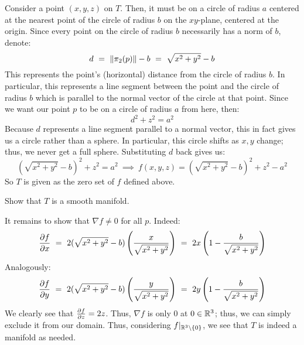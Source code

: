 \vspace{-0.3in}
\begin{soln}
    Consider a point $ (x,y,z) $ on $ T $. Then, it must be on a circle of
    radius $ a $ centered at the nearest point of the circle of radius $ b $ on
    the $ xy $-plane, centered at the origin. Since every point on the circle of
    radius $ b $ necessarily has a norm of $ b $, denote:
    \begin{equation*}
        d \ = \ \norm{\pi_{2}(p)} - b \ = \ \sqrt{x^{2}+y^{2}}-b
    \end{equation*}
    This represents the point's (horizontal) distance from the circle of radius
    $ b $. In particular, this represents a line segment between the point and
    the circle of radius $ b $ which is parallel to the normal vector of the
    circle at that point. Since we want our point $ p $ to be on a circle of
    radius $ a $ from here, then:
    \begin{equation*}
        d^{2}+z^{2}=a^{2}
    \end{equation*}
    Because $ d $ represents a line segment parallel to a normal vector, this
    in fact gives us a circle rather than a sphere. In particular, this circle
    shifts as $ x,y $ change; thus, we never get a full sphere. Substituting
    $ d $ back gives us:
    \begin{equation*}
        (\sqrt{x^{2}+y^{2}}-b)^{2}+z^{2}=a^{2} \ \implies \
        f(x,y,z) = (\sqrt{x^{2}+y^{2}}-b)^{2}+z^{2}-a^{2}
    \end{equation*}
    So $ T $ is given as the zero set of $ f $ defined above.
\end{soln}

\newpage
\begin{qu}[num=41.2]
    Show that $ T $ is a smooth manifold.
\end{qu}

\begin{soln}
    It remains to show that $ \nabla f \neq 0 $ for all $ p $. Indeed:
    \begin{equation*}
        \frac{\partial f}{\partial x} \ = \
        2(\sqrt{x^{2}+y^{2}}-b)\left( \frac{x}{\sqrt{x^{2}+y^{2}}} \right) \ = \
        2x \left( 1-\frac{b}{\sqrt{x^{2}+y^{2}}} \right)
    \end{equation*}
    Analogously:
    \begin{equation*}
        \frac{\partial f}{\partial y} \ = \
        2(\sqrt{x^{2}+y^{2}}-b)\left( \frac{y}{\sqrt{x^{2}+y^{2}}} \right) \ = \
        2y \left( 1-\frac{b}{\sqrt{x^{2}+y^{2}}} \right)
    \end{equation*}
    We clearly see that $ \frac{\partial f}{\partial z} = 2z $. Thus, $ \nabla f $ is only 0
    at $ 0 \in \mathbb{R}^{3} $; thus, we can simply exclude it from our domain. Thus,
    considering $ f\rvert_{\mathbb{R}^{3}\setminus\left\{{0}\right\}} $, we see that $ T $ is
    indeed a manifold as needed.
\end{soln}

